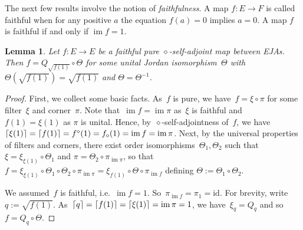 \documentclass[submission,copyright,creativecommons]{eptcs}
\newcounter{main}
\newtheorem{lemma}[main]{Lemma}
\theoremstyle{definition}
\DeclarePairedDelimiter{\ceil}{\lceil}{\rceil}
\DeclareMathOperator{\im}{im}
\newcommand{\id}{\mathrm{id}}
\newcommand\after{\mathbin{\circ}}
\begin{document}
The next few results involve the notion of \emph{faithfulness}. A
map $f:E\rightarrow F$ is called faithful when for any positive $a$
the equation $f(a)=0$ implies $a=0$. A map $f$ is faithful if and
only if $\im{f} = 1$.
\begin{lemma}
	Let $f:E\rightarrow E$ be a faithful pure $\diamond$-self-adjoint map between
    EJAs. Then $f=Q_{\sqrt{f(1)}}\circ \Theta$ for some unital Jordan isomorphism~$\Theta$
    with~$\Theta(\sqrt{f(1)})=\sqrt{f(1)}$ and $\Theta=\Theta^{-1}$.
\end{lemma}
\begin{proof}
    First, we collect some basic facts.
	As~$f$ is pure, we have~$f = \xi\circ \pi$ for
	some filter~$\xi$ and corner~$\pi$.
    Note
    that~$\im{f}=\im{\pi}$ as~$\xi$ is faithful and~$f(1)=\xi(1)$
	as $\pi$ is unital.
    Hence, by~$\diamond$-self-adjointness of~$f$,
	we have~$\ceil{\xi(1)} = \ceil{f(1)} = f^\diamond(1)=f_\diamond(1)
	    = \im{f} = \im{\pi}$.
        Next, by the universal properties
        of filters and corners,
        there exist order
        isomorphisms~$\Theta_1,\Theta_2$ such that~$\xi = \xi_{\xi(1)}\circ \Theta_1$ and
	$\pi = \Theta_2\circ\pi_{\im{\pi}}$, so that $f=\xi_{\xi(1)}\circ
	\Theta_1\circ \Theta_2 \circ \pi_{\im{\pi}} = \xi_{f(1)}\circ
	\Theta \circ \pi_{\im{f}}$ defining $\Theta :=
	\Theta_1\circ\Theta_2$.

    We assumed~$f$ is faithful, i.e.~$\im f = 1$.
    So~$\pi_{\im f} = \pi_1=\id$.
    For brevity, write~$q := \sqrt{f(1)}$.
    As~$\ceil{q}=\ceil{f(1)}=\ceil{\xi(1)} = \im \pi = 1$,
        we have~$\xi_q = Q_q$
        and so~$f = Q_q\after \Theta$.


\end{proof}
\end{document}
